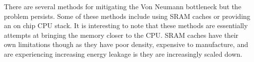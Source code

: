 \documentclass{sig-alternate}
\begin{document}
There are several methods for mitigating the Von Neumann bottleneck but the problem persists.  Some of these methods include using SRAM caches or providing an on chip CPU stack.  It is interesting to note that these methods are essentially attempts at bringing the memory closer to the CPU.  SRAM caches have their own limitations though as they have poor density, expensive to manufacture, and are experiencing increasing energy leakage is they are increasingly scaled down.
\end{document}
